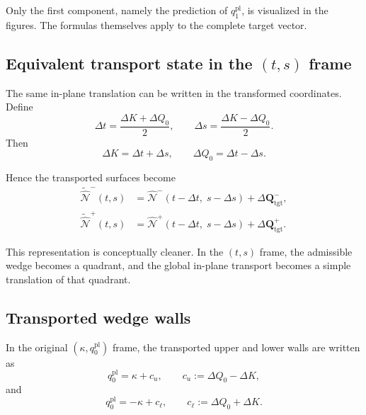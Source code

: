 \documentclass[11pt,a4paper]{article}
\begin{document}
Only the first component, namely the prediction of \(q^{\mathrm{pl}}_1\), is visualized in the figures. The formulas themselves apply to the complete target vector.

\subsection{Equivalent transport state in the \texorpdfstring{$(t,s)$}{(t,s)} frame}

The same in-plane translation can be written in the transformed coordinates. Define
\begin{equation}
\Delta t
=
\frac{\Delta K+\Delta Q_0}{2},
\qquad
\Delta s
=
\frac{\Delta K-\Delta Q_0}{2}.
\label{eq:delta_ts_from_deltaKQ_transport_ref}
\end{equation}
Then
\begin{equation}
\Delta K = \Delta t + \Delta s,
\qquad
\Delta Q_0 = \Delta t - \Delta s.
\label{eq:deltaKQ_from_delta_ts_transport_ref}
\end{equation}

Hence the transported surfaces become
\begin{align}
\widetilde{\widehat{\mathcal{N}}}^{-}(t,s)
&=
\widehat{\mathcal{N}}^{-}(t-\Delta t,\;s-\Delta s)
+
\Delta \mathbf{Q}_{\mathrm{tgt}}^{-},
\label{eq:Nminus_transported_ts_transport_ref}
\\
\widetilde{\widehat{\mathcal{N}}}^{+}(t,s)
&=
\widehat{\mathcal{N}}^{+}(t-\Delta t,\;s-\Delta s)
+
\Delta \mathbf{Q}_{\mathrm{tgt}}^{+}.
\label{eq:Nplus_transported_ts_transport_ref}
\end{align}

This representation is conceptually cleaner. In the \((t,s)\) frame, the admissible wedge becomes a quadrant, and the global in-plane transport becomes a simple translation of that quadrant.

\subsection{Transported wedge walls}

In the original \((\kappa,q^{\mathrm{pl}}_0)\) frame, the transported upper and lower walls are written as
\begin{equation}
q^{\mathrm{pl}}_0 = \kappa + c_u,
\qquad
c_u := \Delta Q_0 - \Delta K,
\label{eq:cu_definition_transport_ref}
\end{equation}
and
\begin{equation}
q^{\mathrm{pl}}_0 = -\kappa + c_\ell,
\qquad
c_\ell := \Delta Q_0 + \Delta K.
\label{eq:cl_definition_transport_ref}
\end{equation}
\end{document}
